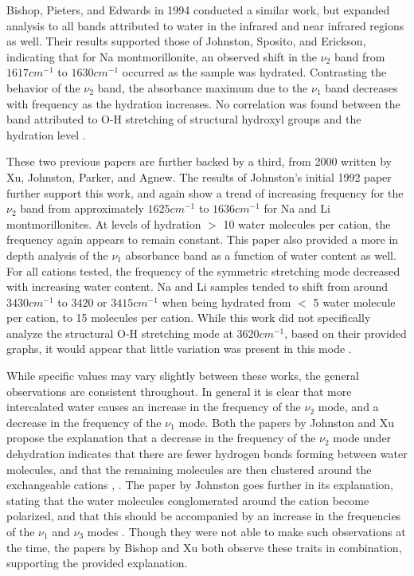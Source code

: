 Bishop, Pieters, and Edwards in 1994 conducted a similar work, but expanded analysis to all bands attributed to water in the infrared and near infrared regions as well. Their results supported those of Johnston, Sposito, and Erickson, indicating that for Na montmorillonite, an observed shift in the $\nu_2$ band from $1617cm^{-1}$ to $1630cm^{-1}$ occurred as the sample was hydrated. Contrasting the behavior of the $\nu_2$ band, the absorbance maximum due to the $\nu_1$ band decreases with frequency as the hydration increases. No correlation was found between the band attributed to O-H stretching of structural hydroxyl groups and the hydration level \cite{bishop1994infrared}.

These two previous papers are further backed by a third, from 2000 written by Xu, Johnston, Parker, and Agnew. The results of Johnston's initial 1992 paper further support this work, and again show a trend of increasing frequency for the $\nu_2$ band from approximately $1625cm^{-1}$ to $1636cm^{-1}$ for Na and Li montmorillonites. At levels of hydration $>$ 10 water molecules per cation, the frequency again appears to remain constant. This paper also provided a more in depth analysis of the $\nu_1$ absorbance band as a function of water content as well. For all cations tested, the frequency of the symmetric stretching mode decreased with increasing water content. Na and Li samples tended to shift from around $3430cm^{-1}$ to $3420$ or $3415cm^{-1}$ when being hydrated from $<$ 5 water molecule per cation, to 15 molecules per cation. While this work did not specifically analyze the structural O-H stretching mode at $3620cm^{-1}$, based on their provided graphs, it would appear that little variation was present in this mode \cite{xu2000infrared}.

While specific values may vary slightly between these works, the general observations are consistent throughout. In general it is clear that more intercalated water causes an increase in the frequency of the $\nu_2$ mode, and a decrease in the frequency of the $\nu_1$ mode. Both the papers by Johnston and Xu propose the explanation that a decrease in the frequency of the $\nu_2$ mode under dehydration indicates that there are fewer hydrogen bonds forming between water molecules, and that the remaining molecules are then clustered around the exchangeable cations \cite{xu2000infrared}, \cite{johnston1992vibrational}. The paper by Johnston goes further in its explanation, stating that the water molecules conglomerated around the cation become polarized, and that this should be accompanied by an increase in the frequencies of the $\nu_1$ and $\nu_3$ modes \cite{johnston1992vibrational}. Though they were not able to make such observations at the time, the papers by Bishop and Xu both observe these traits in combination, supporting the provided explanation.

